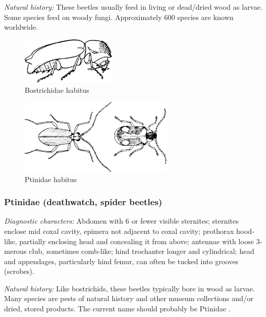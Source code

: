 \noindent{}\textit{Natural history:} These beetles usually feed in living or dead/dried wood as larvae. Some species feed on woody fungi. Approximately 600 species are known worldwide.

\begin{figure}[ht!]
  \centering
     \includegraphics[width=0.4\textwidth]{sections/img/coleopterida/bostrichid}
  \caption{Bostrichidae habitus \citep[redrawn from][Fig. 183b]{bhlitem92397}}
  \label{fig:bostrichid}
\end{figure}

\begin{figure}[ht!]
  \centering
     \includegraphics[width=0.65\textwidth]{sections/img/coleopterida/ptinids}
  \caption{Ptinidae habitus \citep[redrawn from][Plate 54, Figs 5,6]{bhlitem37317beetles}}
  \label{fig:anobiid}
\end{figure}

\subsubsection{Ptinidae (deathwatch, spider beetles)}
\noindent{}\textit{Diagnostic characters:} Abdomen with 6 or fewer visible sternites; sternites enclose mid coxal cavity, epimera not adjacent to coxal cavity; prothorax hood-like, partially enclosing head and concealing it from above; antennae with loose 3-merous club, sometimes comb-like; hind trochanter longer and cylindrical; head and appendages, particularly hind femur, can often be tucked into grooves (scrobes).\vspace{3mm}

\noindent{}\textit{Natural history:} Like bostrichids, these beetles typically bore in wood as larvae. Many species are pests of natural history and other museum collections and/or dried, stored products. The current name should probably be Ptinidae \citep{arango2012death}.


